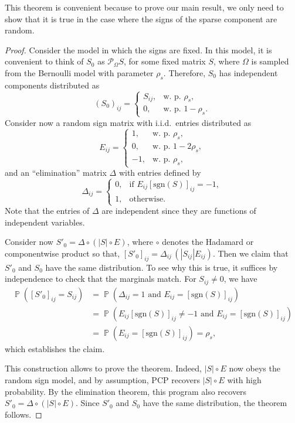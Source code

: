This theorem is convenient because to prove our main result, we only need to show that it is true in the case where the signs of the sparse component are random.

\begin{proof}
  Consider the model in which the signs are fixed. In this model, it is convenient to think of $S_0$ as $\mathcal{P}_{\Omega} S$, for some fixed matrix $S$, where $\Omega$ is sampled from the Bernoulli model with parameter $\rho_s$. Therefore, $S_0$ has independent components distributed as
 \begin{equation*}
   (S_0)_{ij} = \begin{cases} S_{ij}, &
     \text{w.~p. }
     \rho_s,\\
     0, & \text{w.~p. } 1-\rho_s.
\end{cases} 
\end{equation*}
Consider now a random sign matrix with i.i.d.~entries distributed as
\[
E_{ij} = \begin{cases} 1, & \text{w.~p. }
  \rho_s,\\
  0, & \text{w.~p. } 1-2\rho_s,\\
  -1, & \text{w.~p. } \rho_s,
\end{cases} 
\]
and an ``elimination'' matrix $\Delta$ with entries defined by
\[
\Delta_{ij} =  \begin{cases} 0, & \text{if } E_{ij} [\textrm{sgn}(S)]_{ij} = -1,\\
1, & \text{otherwise}.
\end{cases} 
\]
Note that the entries of $\Delta$ are independent since they are functions of independent variables.

Consider now $S'_0 = \Delta \circ (|S| \circ E)$, where $\circ$
denotes the Hadamard or componentwise product so that, $[S'_0]_{ij} =
\Delta_{ij} \, (|S_{ij}| E_{ij})$. Then we claim that $S'_0$ and $S_0$ have the same distribution. To see why this is true, it suffices by independence to check that the marginals match. For $S_{ij} \neq 0$, we have
\begin{align*}
  \operatorname{\mathbb{P}}([S'_0]_{ij} = S_{ij}) & = \operatorname{\mathbb{P}}(\Delta_{ij} = 1 \text{ and } E_{ij} =
  [\textrm{sgn}(S)]_{ij})\\
  & = \operatorname{\mathbb{P}}( E_{ij} [\textrm{sgn}(S)]_{ij} \neq -1 \text{ and } E_{ij} =
  [\textrm{sgn}(S)]_{ij})\\
  & = \operatorname{\mathbb{P}}(E_{ij} = [\textrm{sgn}(S)]_{ij}) = \rho_s,
\end{align*}
which establishes the claim. 

This construction allows to prove the theorem. Indeed, $|S| \circ E$ now obeys the random sign model, and by assumption, PCP recovers $|S|
\circ E$ with high probability. By the elimination theorem, this program also recovers $S'_0 = \Delta \circ (|S| \circ E)$. Since $S'_0$ and $S_0$ have the same distribution, the theorem follows.
\end{proof}

